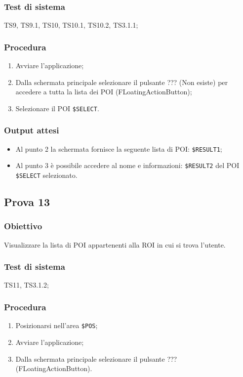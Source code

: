 \documentclass[../Sperimentazione.tex]{subfiles}
\begin{document}
	\subsubsection{Test di sistema}
		TS9, TS9.1,
		TS10, TS10.1, TS10.2,
		TS3.1.1;

	\subsubsection{Procedura}
		\begin{enumerate}
		\item Avviare l'applicazione;
		\item Dalla schermata principale selezionare il pulsante ??? (Non esiste) per accedere a tutta la lista dei POI (FLoatingActionButton);
		\item Selezionare il POI  \verb|$SELECT|.
		\end{enumerate}
		
	\subsubsection{Output attesi}
		\begin{itemize}
		\item Al punto 2 la schermata fornisce la seguente lista di POI:  \verb|$RESULT1|;
		\item Al punto 3 è possibile accedere al nome e informazioni:  \verb|$RESULT2| del POI  \verb|$SELECT| selezionato.
		\end{itemize}
	

	
\newpage	
\subsection{Prova 13} %
\label{subsec:Prova13}
	
	\subsubsection{Obiettivo}
		Visualizzare la lista di POI appartenenti alla ROI in cui si trova l'utente.
		
	\subsubsection{Test di sistema}
		TS11,
		TS3.1.2;
		
	\subsubsection{Procedura}
		\begin{enumerate}
		\item Posizionarsi nell'area \verb|$POS|;
		\item Avviare l'applicazione;
		\item Dalla schermata principale selezionare il pulsante ??? (FLoatingActionButton).
		\end{enumerate}
		
\end{document}

